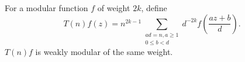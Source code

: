 For a modular function $f$ of weight $2k$, define
$$T(n)f(z) = n^{2k-1} \sum_{\substack{ad=n, a \geq 1 \\ 0 \leq b < d}} d^{-2k} f\left(\frac{az+b}{d}\right).$$
$T(n)f$ is weakly modular of the same weight.
